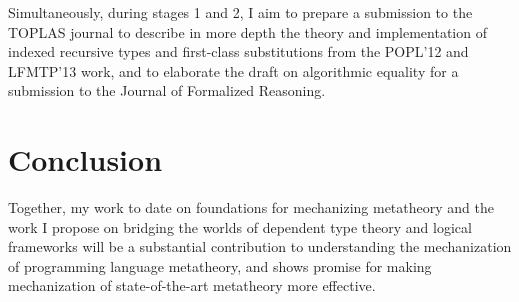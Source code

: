 \documentclass{article}
\begin{document}
Simultaneously, during stages 1 and 2, I aim to prepare a submission to the TOPLAS journal to
describe in more depth the theory and implementation of indexed
recursive types and first-class substitutions from 
the POPL'12 and LFMTP'13 work, and to elaborate the draft on algorithmic
equality for a submission to the Journal of Formalized Reasoning.

\section{Conclusion}
Together, my work to date on foundations for mechanizing metatheory
and the work I propose on bridging the worlds of dependent type theory
and logical frameworks will be a substantial contribution to
understanding the mechanization of programming language metatheory,
and shows promise for making mechanization of state-of-the-art
metatheory more effective.



\end{document}
